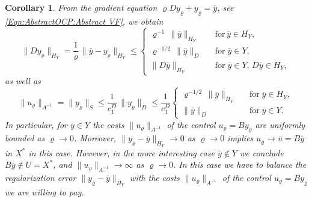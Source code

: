 \documentclass{article}
\newtheorem{cor}{Corollary}
\numberwithin{equation}{section}
\begin{document}
\begin{cor}
  From the gradient equation
  $\varrho D y_\varrho + y_\varrho = \overline{y}$, see
  \eqref{Eqn:AbstractOCP:Abstract VF}, we obtain
  \[
    \| D y_\varrho \|_{H_Y} = \frac{1}{\varrho} \,
    \| \overline{y} - y_\varrho \|_{H_Y} \leq \left \{
      \begin{array}{ccl}
        \varrho^{-1} \, \| \overline{y} \|_{H_Y}
        & & \mbox{for} \, \overline{y} \in H_Y, \\[1mm]
        \varrho^{-1/2} \, \| \overline{y} \|_D
        & & \mbox{for} \; \overline{y} \in Y, \\[1mm]
        \| D \overline{y} \|_{H_Y}
        & & \mbox{for} \; \overline{y} \in Y, \, D \overline{y} \in H_Y ,
      \end{array} \right.
  \]
  as well as
  \[
    \| u_\varrho \|_{A^{-1}} = \| y_\varrho \|_S \leq 
    \frac{1}{c_1^D} \, \| y_\varrho \|_D
    \leq \frac{1}{c_1^D} \left \{
      \begin{array}{ccl}
        \varrho^{-1/2} \, \| \overline{y} \|_{H_Y}
        && \mbox{for} \; \overline{y} \in H_Y, \\[1mm]
        \| \overline{y} \|_D
        && \mbox{for} \; \overline{y} \in Y.
      \end{array}
      \right.
  \]
  In particular, for $\overline{y} \in Y$ the costs
  $\| u_\varrho \|_{A^{-1}}$ of the control $u_\varrho = B y_\varrho$ are
  uniformly bounded as $\varrho \to 0$. Moreover,
  $ \| y_\varrho - \overline{y} \|_{H_Y} \to 0 $
  as $\varrho \to 0$ implies $ u_\varrho \to \overline{u} = B \overline{y}$
  in $X^*$ in this case. However, in the more interesting case
  $\overline{y} \not \in Y$ we conclude $B \overline{y} \not\in U=X^*$,
  and $\| u_\varrho \|_{A^{-1}} \to \infty$ as $\varrho \to 0$. In this case
  we have to balance the regularization error
  $\| y_\varrho - \overline{y} \|_{H_Y}$ with the costs
  $\| u_\varrho \|_{A^{-1}}$ of the control $u_\varrho = B y_\varrho$ we are
  willing to pay.
\end{cor}
\end{document}
